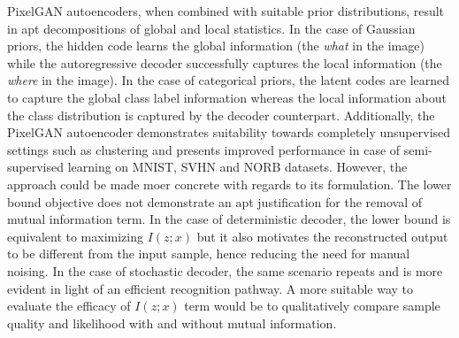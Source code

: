 \documentclass[11pt,letterpaper]{article}
\begin{document}
PixelGAN autoencoders, when combined with suitable prior distributions, result in apt decompositions of global and local statistics. In the case of Gaussian priors, the hidden code learns the global information (the \textit{what} in the image) while the autoregressive decoder successfully captures the local information (the \textit{where} in the image). In the case of categorical priors, the latent codes are learned to capture the global class label information whereas the local information about the class distribution is captured by the decoder counterpart. Additionally, the PixelGAN autoencoder demonstrates suitability towards completely unsupervised settings such as clustering and presents improved performance in case of semi-supervised learning on MNIST, SVHN and NORB datasets. However, the approach could be made moer concrete with regards to its formulation. The lower bound objective does not demonstrate an apt justification for the removal of mutual information term. In the case of deterministic decoder, the lower bound is equivalent to maximizing $I(z;x)$ but it also motivates the reconstructed output to be different from the input sample, hence reducing the need for manual noising. In the case of stochastic decoder, the same scenario repeats and is more evident in light of an efficient recognition pathway. A more suitable way to evaluate the efficacy of $I(z;x)$ term would be to qualitatively compare sample quality and likelihood with and without mutual information.
\end{document}
